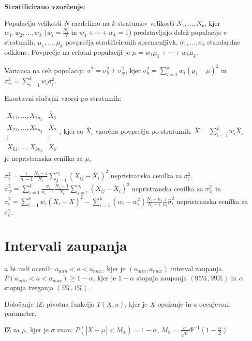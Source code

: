 \documentclass[11pt,a4paper]{amsart}
\theoremstyle{definition} %
\theoremstyle{plain} %
\newcommand{\X}{\underline{X}}
\begin{document}
\textbf{Stratificirano vzorčenje}:

Populacijo velikosti $N$ razdelimo na $k$ stratumov velikosti $N_1,\ldots,N_k$,
kjer $w_1,w_2,\ldots ,w_k$ ($w_i = \frac{N_i}{N}$ in $w_1 + \cdots + w_k = 1$)
predstavljajo delež populacije v stratumih, $\mu_1,\ldots, \mu_k$ povprečja
stratificiranih spremenljivk, $\sigma_1,\ldots,\sigma_k$ standardne odklone.
Povprečje na celotni populaciji je $\mu = w_1\mu_1 + \cdots + w_k\mu_k$.

Varianca na celi populaciji: $\sigma^2 = \sigma_b^2 + \sigma_w^2$, kjer $\sigma_b^2 = \sum_{i=1}^k w_i(\mu_i - \mu)^2$ in $\sigma_w^2 = \sum_{i=1}^k w_i \sigma_i^2$.

Enostavni slučajni vzorci po stratumih:

$
\begin{matrix}
X_{11},\ldots ,X_{1n_1} & \overline{X}_1 \\
X_{21}, \ldots ,X_{2n_2} & \overline{X}_2 \\
\vdots & \vdots \\
X_{k1},\ldots , X_{kn_k} & \overline{X}_k
\end{matrix}
$,
kjer so $\overline{X}_i$ vzorčna povprečja po stratumih. $\overline{X} =
\sum_{i=1}^k w_i \overline{X}_i$ je nepristranska cenilka za $\mu$,

$\sigma_i^2 = \frac{1}{n_i - 1} \frac{N_i -1}{N_i} \sum_{j=1}^{n_i} (X_{ij} -
\overline{X}_i)^2$ nepristranska cenilka za $\sigma_i^2$, $\widehat{\sigma}_w^2
= \sum_{i=1}^k \frac{w_i}{n_i - 1} \frac{N_i-1}{N_i}\sum_{j=1}^{n_i} (X_{ij} -
\overline{X}_i)^2$  nepristranska cenilka za $\sigma_w^2$ in
$\widehat{\sigma}_b^2 = \sum_{i=1}^k w_i (\overline{X}_i - \overline{X})^2 -
\sum_{i=1}^k (w_i - w_i^2) \frac{N_i - n_i}{N_i - 1}\frac{1}{n_i}
\widehat{\sigma}_i^2$ nepristranska cenilka za $\sigma_b^2$.

\section*{Intervali zaupanja}

$a$ bi radi ocenili: $a_{min} < a < a_{max}$, kjer je $(a_{min},a_{max})$
interval zaupanja. $P(a_{min} < a < a_{max}) \geq 1-\alpha$, kjer je $1-\alpha$
stopnja zaupanja $(95\%, 99\%)$ in $\alpha$ stopnja tveganja $(5\%, 1\%)$.

Določanje IZ: pivotna funkcija $T(\X , a)$, kjer je $\X$ opažanje in $a$
ocenjevani parameter.

IZ za $\mu$, kjer je $\sigma$ znan: $P(|\overline{X} - \mu| < M_\alpha ) =
1-\alpha$, $M_\alpha = \frac{\sigma}{\sqrt{n}} \Phi^{-1}(1-\frac{\alpha}{2})$
\end{document}
